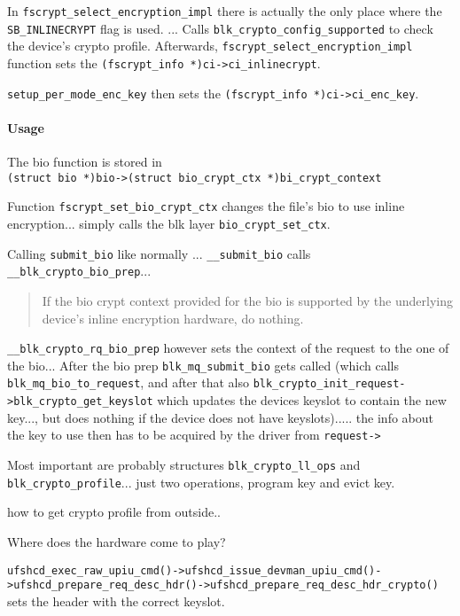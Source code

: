 In \verb|fscrypt_select_encryption_impl| there is actually the only place where the \verb|SB_INLINECRYPT| flag is used.
... Calls \verb|blk_crypto_config_supported| to check the device's crypto profile.
Afterwards, \verb|fscrypt_select_encryption_impl| function sets the \verb|(fscrypt_info *)ci->ci_inlinecrypt|.

\verb|setup_per_mode_enc_key| then sets the \verb|(fscrypt_info *)ci->ci_enc_key|.

\paragraph{Usage}

The bio function is stored in \\ \verb|(struct bio *)bio->(struct bio_crypt_ctx *)bi_crypt_context|

Function \verb|fscrypt_set_bio_crypt_ctx| changes the file's bio to use inline encryption... simply calls the blk layer \verb|bio_crypt_set_ctx|.

Calling \verb|submit_bio| like normally ... \verb|__submit_bio| calls \verb|__blk_crypto_bio_prep|...

\blockquote{If the bio crypt context provided for the bio is supported by the underlying device's inline encryption hardware, do nothing.}

\verb|__blk_crypto_rq_bio_prep| however sets the context of the request to the one of the bio... 
After the bio prep  \verb|blk_mq_submit_bio| gets called (which calls \verb|blk_mq_bio_to_request|, and after that also \verb|blk_crypto_init_request->blk_crypto_get_keyslot| which updates the devices keyslot to contain the new key..., but does nothing if the device does not have keyslots)..... the info about the key to use then has to be acquired by the driver from \verb|request->|


Most important are probably structures \verb|blk_crypto_ll_ops| and \verb|blk_crypto_profile|... just two operations, program key and evict key. 



how to get crypto profile from outside..




Where does the hardware come to play?

\verb|ufshcd_exec_raw_upiu_cmd()->ufshcd_issue_devman_upiu_cmd()->ufshcd_prepare_req_desc_hdr()->ufshcd_prepare_req_desc_hdr_crypto()| sets the header with the correct keyslot.
